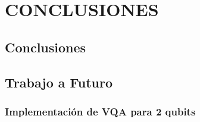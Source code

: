 \documentclass[letterpaper,12pt]{thesisECFM}
\theoremstyle{plain}
\theoremstyle{definition}
\theoremstyle{remark}
\newcommand{\1}{\mathbb{1}}
\begin{document}
\chapter{CONCLUSIONES}
\section{Conclusiones}
\section{Trabajo a Futuro}
\subsection{Implementación de VQA para 2 qubits}

\appendix





\end{document}
